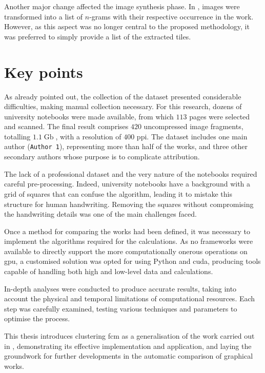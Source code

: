\begin{toReview}
		\noindent Another major change affected the image synthesis phase. In \cite{thesis}, images were transformed into a list of $n$-grams with their respective occurrence in the work. However, as this aspect was no longer central to the proposed methodology, it was preferred to simply provide a list of the extracted tiles.

	\section{Key points}
		As already pointed out, the collection of the dataset presented considerable difficulties, making manual collection necessary. For this research, dozens of university notebooks were made available, from which $113$ pages were selected and scanned. The final result comprises $420$ uncompressed image fragments, totalling $1.1\operatorname{\mathrm{Gb}}$, with a resolution of $400$ \gls{ppi}. The dataset includes one main author (\texttt{Author 1}), representing more than half of the works, and three other secondary authors whose purpose is to complicate attribution.

		\noindent The lack of a professional dataset and the very nature of the notebooks required careful pre-processing. Indeed, university notebooks have a background with a grid of squares that can confuse the algorithm, leading it to mistake this structure for human handwriting. Removing the squares without compromising the handwriting details was one of the main challenges faced.

		\noindent Once a method for comparing the works had been defined, it was necessary to implement the algorithms required for the calculations. As no frameworks were available to directly support the more computationally onerous operations on \gls{gpu}, a customised solution was opted for using \gls{Python} and \gls{cuda}, producing tools capable of handling both high and low-level data and calculations.

		\noindent In-depth analyses were conducted to produce accurate results, taking into account the physical and temporal limitations of computational resources. Each step was carefully examined, testing various techniques and parameters to optimise the process.

		\noindent This thesis introduces clustering \gls{fcm} as a generalisation of the work carried out in \cite{thesis}, demonstrating its effective implementation and application, and laying the groundwork for further developments in the automatic comparison of graphical works.


\end{toReview}
